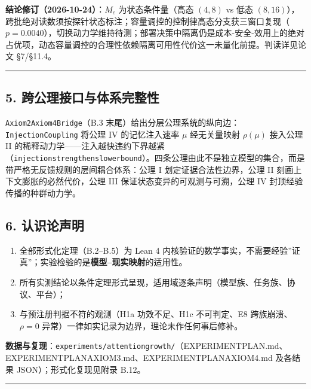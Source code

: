 \documentclass[
]{ctexart}
\providecommand{\tightlist}{%
  \setlength{\itemsep}{0pt}\setlength{\parskip}{0pt}}
\renewcommand{\_}{\discretionary{}{}{\textunderscore}}
\begin{document}
\textbf{结论修订（2026-10-24）}：\(M_c\) 为状态条件量（高态 \((4,8)\) vs
低态
\((8,16)\)），跨批绝对读数须按探针状态标注；容量调控的控制律高态分支获三窗口复现（\(p{=}0.0040\)），切换动力学维持待测；部署决策中隔离仍是成本-安全-效用上的绝对占优项，动态容量调控的合理性依赖隔离可用性代价这一未量化前提。判读详见论文
§7/§11.4。

\begin{center}\rule{0.5\linewidth}{0.5pt}\end{center}

\subsection{5.
跨公理接口与体系完整性}\label{ux8de8ux516cux7406ux63a5ux53e3ux4e0eux4f53ux7cfbux5b8cux6574ux6027}

\texttt{Axiom2\_Axiom4\_Bridge}（B.3
末尾）给出分层公理系统的纵向边：\texttt{InjectionCoupling} 将公理 IV
的记忆注入速率 \(\mu\) 经无关量映射 \(\rho(\mu)\) 接入公理 II
的稀释动力学------注入越快违约下界越紧（\texttt{injection\_strengthens\_lower\_bound}）。四条公理由此不是独立模型的集合，而是带严格无反馈规则的层间耦合体系：公理
I 划定证据合法性边界，公理 II 刻画上下文膨胀的必然代价，公理 III
保证状态变异的可观测与可溯，公理 IV 封顶经验传播的种群动力学。

\subsection{6. 认识论声明}\label{ux8ba4ux8bc6ux8bbaux58f0ux660e}

\begin{enumerate}
\def\labelenumi{\arabic{enumi}.}
\tightlist
\item
  全部形式化定理（B.2--B.5）为 Lean 4
  内核验证的数学事实，不需要经验''证真''；实验检验的是\textbf{模型--现实映射}的适用性。
\item
  所有实测结论以条件定理形式呈现，适用域逐条声明（模型族、任务族、协议、平台）；
\item
  与预注册判据不符的观测（H1a 功效不足、H1c 不可判定、E8
  跨族崩溃、\(\rho=0\) 异常）一律如实记录为边界，理论未作任何事后修补。
\end{enumerate}

\textbf{数据与复现}：\texttt{experiments/attention\_growth/}（EXPERIMENT\_PLAN.md、EXPERIMENT\_PLAN\_AXIOM3.md、EXPERIMENT\_PLAN\_AXIOM4.md
及各结果 JSON）；形式化复现见附录 B.12。

\begin{center}\rule{0.5\linewidth}{0.5pt}\end{center}
\end{document}
